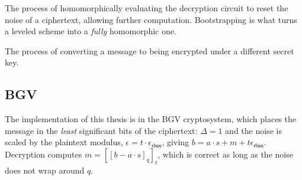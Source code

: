 \begin{definition}[Bootstrapping]
    The process of homomorphically evaluating the decryption circuit to reset the noise of a ciphertext, allowing further computation. Bootstrapping is what turns a leveled scheme into a \textit{fully} homomorphic one.
\end{definition}

\begin{definition}[Keyswitching]
    The process of converting a message to being encrypted under a different secret key.
\end{definition}

\subsection{BGV}
The implementation of this thesis is in the BGV cryptosystem, which places the message in the \textit{least} significant bits of the ciphertext: $\Delta = 1$ and the noise is scaled by the plaintext modulus, $\epsilon = t\cdot \epsilon_{\mathsf{rlwe}}$, giving $b = a\cdot s + m + t\epsilon_{\mathsf{rlwe}}$. Decryption computes $m = \left[[b - a\cdot s]_q\right]_t$, which is correct as long as the noise does not wrap around $q$.
